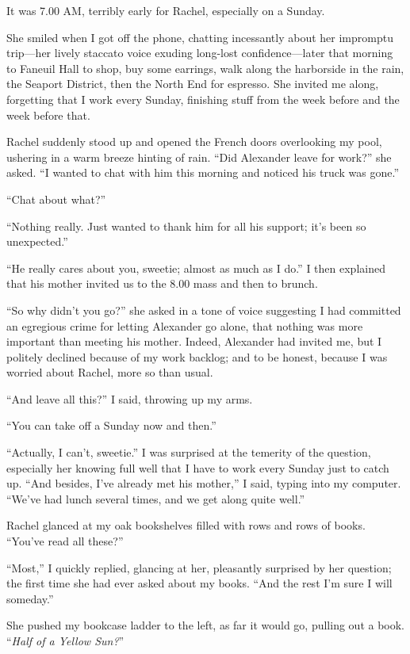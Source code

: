 It was 7.00 AM, terribly early for Rachel, especially on a Sunday.

She smiled when I got off the phone, chatting incessantly about her
impromptu trip---her lively staccato voice exuding long-lost
con\-fi\-dence---later that morning to Faneuil Hall to shop, buy some
earrings, walk along the harborside in the rain, the Seaport District,
then the North End for espresso. She invited me along, forgetting that I
work every Sunday, finishing stuff from the week before and the week
before that.

Rachel suddenly stood up and opened the French doors overlooking my
pool, ushering in a warm breeze hinting of rain. ``Did Alexander leave
for work?'' she asked. ``I wanted to chat with him this morning and
noticed his truck was gone.''

``Chat about what?''

``Nothing really. Just wanted to thank him for all his support; it's
been so unexpected.''

``He really cares about you, sweetie; almost as much as I do.'' I then
explained that his mother invited us to the 8.00 mass and then to
brunch.

``So why didn't you go?'' she asked in a tone of voice suggesting I had
committed an egregious crime for letting Alexander go alone, that
nothing was more important than meeting his mother. Indeed, Alexander
had invited me, but I politely declined because of my work backlog; and
to be honest, because I was worried about Rachel, more so than usual.

``And leave all this?'' I said, throwing up my arms.

``You can take off a Sunday now and then.''

``Actually, I can't, sweetie.'' I was surprised at the temerity of the
question, especially her knowing full well that I have to work every
Sunday just to catch up. ``And besides, I've already met his mother,'' I
said, typing into my computer. ``We've had lunch several times, and we
get along quite well.''

Rachel glanced at my oak bookshelves filled with rows and rows of books.
``You've read all these?''

``Most,'' I quickly replied, glancing at her, pleasantly surprised by
her question; the first time she had ever asked about my books. ``And
the rest I'm sure I will someday.''

She pushed my bookcase ladder to the left, as far it would go, pulling
out a book. ``\emph{Half of a Yellow Sun?}''

